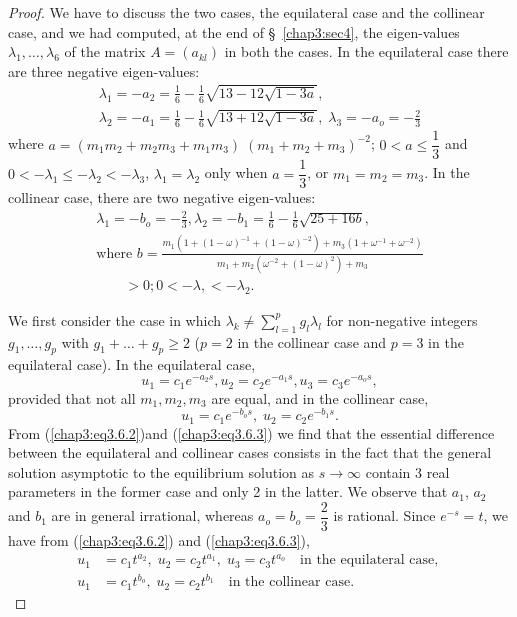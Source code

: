 \begin{proof}
We have to discuss the two cases, the equilateral case and the
colli\-near case, and we had computed, at the end of
\S\ \ref{chap3:sec4}, the eigen-values $\lambda_1, \ldots, \lambda_6$
of the matrix $A = (a_{kl})$ in both the cases. In  the equilateral
case there are three negative eigen-values: 
\begin{gather*}
\lambda_1 = - a_2 = \frac{1}{6} -\frac{1}{6}
\sqrt{13-12\sqrt{1-3a}},\\  
\lambda_2 = - a_1 = \frac{1}{6}-\frac{1}{6} \sqrt{13+12\sqrt{1-3a}},
\; \lambda_3 = -a_o = - \frac{2}{3} 
\end{gather*}
where $a = (m_1 m_2 + m_2 m_3 + m_1 m_3) \; (m_1 + m_2 + m_3)^{-2}$;
$0 < a \leq \dfrac{1}{3}$ and $0 < - \lambda_1 \leq -\lambda_2 < -
\lambda_3$, $\lambda_1 = \lambda_2$ only when $a = \dfrac{1}{3}$, or
$m_1 = m_2 = m_3$.  
In the collinear case, there are two negative eigen-values:
\begin{gather*}
\lambda_1 = - b_o = - \frac{2}{3}, \lambda_2 = - b_1 = \frac{1}{6}
-\frac{1}{6} \sqrt{25+16b},\\ 
\text{where } b = \frac{m_1 (1+(1-\omega)^{-1} + (1-\omega)^{-2}) +
  m_3 (1+\omega^{-1} + \omega^{-2})}{m_1+ m_2(\omega^{-2} +
  (1-\omega)^2) + m_3}\\ 
\qquad > 0 ; 0 < -\lambda, < -\lambda_2.
\end{gather*}

We first consider the case in which $\lambda_k \neq
\sum\limits^p_{l=1} g_l \lambda_l$ for non-negative integers $g_1,
\ldots, g_p$ with $g_1 + \ldots + g_p \geq 2$ ($p=2$ in the collinear
case and $p=3$ in the equilateral case). In the equilateral case, 
\begin{equation*}
u_1 = c_1 e^{-a_2 s}, u_2 =c_2 e^{-a_1 s}, u_3 = c_3 e^{-a_o s}, 
\tag{3.6.2}\label{chap3:eq3.6.2}
\end{equation*}
provided that not all $m_1, m_2, m_3$ are equal, and in the collinear case,
\begin{equation*}
u_1 = c_1 e^{-b_os} , \; u_2 = c_2 e^{-b_1 s}. \tag{3.6.3}\label{chap3:eq3.6.3}
\end{equation*}
From (\ref{chap3:eq3.6.2})\pageoriginale and (\ref{chap3:eq3.6.3}) we
find that the essential difference between the equilateral and
collinear cases consists in the fact that the general solution
asymptotic to the  equilibrium solution as $s \to \infty$ contain 3
real parameters in the former case and only 2 in the latter. We
observe that $a_1$, $a_2$ and $b_1$ are in general irrational, whereas
$a_o = b_o = \dfrac{2}{3}$ is rational. Since $e^{-s} =t$, we have
from (\ref{chap3:eq3.6.2}) and (\ref{chap3:eq3.6.3}), 
\begin{align*}
u_1 & = c_1 t^{a_2}, \; u_2 = c_2 t^{a_1}, \; u_3 = c_3 t^{a_o} \quad
\text{in the equilateral case, }\tag{3.6.4}\label{chap3:eq3.6.4}\\ 
u_1 & = c_1 t^{b_o}, \; u_2 = c_2 t^{b_1} \quad \text{in the collinear
  case. }\tag{3.6.5}\label{chap3:eq3.6.5} 
\end{align*}
 

\end{proof}
